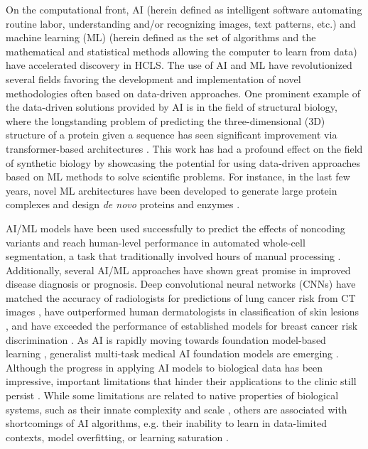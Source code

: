 \documentclass{article}
\begin{document}
On the computational front, AI (herein defined as intelligent software automating routine labor, understanding and/or recognizing images, text patterns, etc.) and machine learning (ML) (herein defined as the set of algorithms and the mathematical and statistical methods allowing the computer to learn from data) have accelerated discovery in HCLS. 
The use of AI and ML have revolutionized several fields favoring the development and implementation of novel methodologies often based on data-driven approaches. One prominent example of the data-driven solutions provided by AI is in the field of structural biology, where the longstanding problem of predicting the three-dimensional (3D) structure of a protein given a sequence \cite{dill2012protein} has seen significant improvement via transformer-based architectures \cite{jumper2021highly}. 
This work has had a profound effect on the field of synthetic biology by showcasing the potential for using data-driven approaches based on ML methods to solve scientific problems. For instance, in the last few years, novel ML architectures have been developed to generate large protein complexes \cite{shin2021protein,humphreys2021computed,wicky2022hallucinating,bryant2022predicting} and design \textit{de novo} proteins and enzymes \cite{anishchenko2021novo,dauparas2022robust,wang2022scaffolding,mazurenko2019machine,yang2019machine}. 

AI/ML models have been used successfully to predict the effects of noncoding variants \cite{zhou2015predicting} and reach human-level performance in automated whole-cell segmentation, a task that traditionally involved hours of manual processing \cite{greenwald2022whole}. Additionally, several AI/ML approaches have shown great promise in improved disease diagnosis or prognosis. Deep convolutional neural networks (CNNs) have matched the accuracy of radiologists for predictions of lung cancer risk from CT images \cite{ardila2019end}, have outperformed human dermatologists in classification of skin lesions \cite{esteva2017dermatologist}, and have exceeded the performance of established models for breast cancer risk discrimination \cite{yala2019deep}. As AI is rapidly moving towards foundation model-based learning \cite{bommasani2021opportunities}, generalist multi-task medical AI foundation models are emerging \cite{moor2023foundation}. Although the progress in applying AI models to biological data has been impressive, important limitations that hinder their applications to the clinic still persist \cite{kelly2019key}. While some limitations are related to native properties of biological systems, such as their innate complexity and scale \cite{cordier2022biology}, others are associated with shortcomings of AI algorithms, e.g. their inability to learn in data-limited contexts, model overfitting, or learning saturation \cite{ott2022mapping}.
\end{document}
